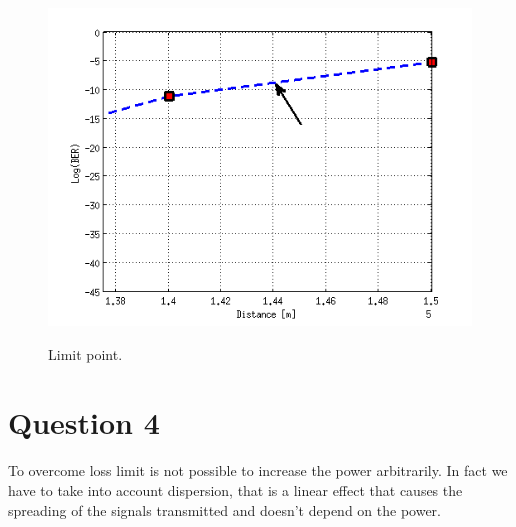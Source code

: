 \documentclass[a4paper,10pt]{report}
\begin{document}
\begin{figure}[!ht]
  \centering
  \includegraphics[width=12cm]{plotzoom.png}\\
  \caption{Limit point.}
  \label{plotzoom}
\end{figure}


\section*{Question 4}
To overcome loss limit is not possible to increase the power arbitrarily. In fact we have to take into account dispersion, that is a linear
effect that causes the spreading of the signals transmitted and doesn't depend on the power.
\end{document}
